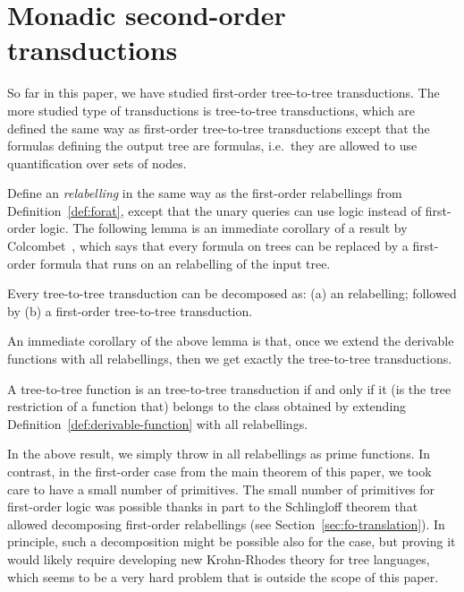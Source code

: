 \section{Monadic second-order transductions}
\label{sec:mso-trans}
So far in this paper, we have studied first-order tree-to-tree transductions. The more studied type of transductions is \mso tree-to-tree transductions, which are defined the same way as first-order tree-to-tree transductions except that the formulas defining the output tree are \mso formulas, i.e.~they are allowed to use quantification over sets of nodes.   

Define an \emph{\mso relabelling} in the same way as the first-order relabellings from Definition~\ref{def:forat}, except that the unary queries can use \mso logic instead of first-order logic.  The following lemma is an immediate corollary of a result by Colcombet~\cite[Corollary 1]{colcombetCombinatorialTheoremTrees2007}, which says that every \mso formula on trees can be replaced by a first-order formula that runs on an \mso relabelling of the input tree. 
\begin{lemma}
    Every \mso tree-to-tree transduction can be decomposed as: (a) an \mso relabelling; followed by (b) a first-order tree-to-tree transduction.
\end{lemma}
An immediate corollary of the above lemma is that, once we extend the derivable functions with all \mso relabellings, then we get exactly the \mso tree-to-tree transductions. 
\begin{theorem}\label{thm:mso-transductions}
    A tree-to-tree function is an \mso tree-to-tree transduction if and only if it (is the tree restriction of a function that)  belongs to the class obtained by extending  Definition~\ref{def:derivable-function} with all \mso relabellings. 
\end{theorem}
In the above result, we simply throw in all \mso relabellings as prime functions. In contrast,  in the first-order case from the main theorem of this paper, we took care to have a small number of primitives. The small number of primitives for first-order logic  was possible thanks in part to the Schlingloff theorem that allowed decomposing first-order relabellings (see Section~\ref{sec:fo-translation}).  In principle, such a decomposition might be possible also for the \mso case, but proving it  would likely require developing new Krohn-Rhodes theory for tree languages, which seems to be a very hard problem that is outside the scope of this paper.



